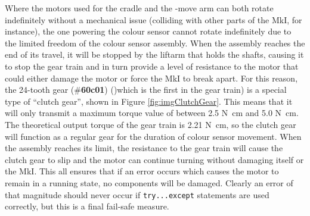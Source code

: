 \documentclass{report}
\newcommand{\tbo}[1]{\textbf{#1}}
\newcommand{\legopiece}[1]{(\#\tbo{#1})}
\newcommand{\move}[1]{\uppercase{\texttt{\formatmovesnospace{#1}}}-move}
\begin{document}
	Where the motors used for the cradle and the \move{x} arm can both rotate indefinitely without a mechanical issue (colliding with other parts of the MkI, for instance), the one powering the colour sensor cannot rotate indefinitely due to the limited freedom of the colour sensor assembly. When the assembly reaches the end of its travel, it will be stopped by the liftarm that holds the shafts, causing it to stop the gear train and in turn provide a level of resistance to the motor that could either damage the motor or force the MkI to break apart. For this reason, the 24-tooth gear \legopiece{60c01} ()which is the first in the gear train) is a special type of \enquote{clutch gear}, shown in Figure \ref{fig:imgClutchGear}. This means that it will only transmit a maximum torque value of between 2.5 \si{\newton\centi\metre} and 5.0 \si{\newton\centi\metre}. The theoretical output torque of the gear train is 2.21 \si{\newton\centi\metre}, so the clutch gear will function as a regular gear for the duration of colour sensor movement. When the assembly reaches its limit, the resistance to the gear train will cause the clutch gear to slip and the motor can continue turning without damaging itself or the MkI. This all ensures that if an error occurs which causes the motor to remain in a running state, no components will be damaged. Clearly an error of that magnitude should never occur if \lstinline|try...except| statements are used correctly, but this is a final fail-safe measure.
	
\end{document}
